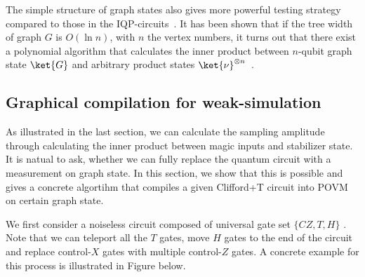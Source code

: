 \documentclass[aps,%
twocolumn,%
floatfix,%
pra,%
amsfonts,%
longbibliography,%
groupedaddress,%
superscriptaddress]{revtex4-2}%
\newcommand{\1}{\mathbbm{1}}
\begin{document}
The simple structure of graph states also gives more powerful testing strategy compared to those in the  IQP-circuits~\cite{nelson2024polynomial,rajakumar2024polynomialtimeclassicalsimulationnoisy}. It has been shown that if the tree width of graph $G$ is $O(\ln n)$, with $n$ the vertex numbers, it turns out that there exist a polynomial algorithm that calculates the inner product between $n$-qubit graph state $\ket{G}$ and arbitrary product states $\ket{\nu}^{\otimes n}$~\cite{van2007classical}.


\subsection{Graphical compilation for weak-simulation}
As illustrated in the last section, we can calculate the sampling amplitude through calculating the inner product between magic inputs and stabilizer state. It is natual to ask, whether we can fully replace the quantum circuit with a measurement on graph state. In this section, we show that this is possible and gives a concrete algortihm that compiles a given Clifford+T circuit into POVM on certain graph state.
 
We first consider a noiseless circuit composed of universal gate set $\{CZ, T,H\}$ . Note that we can teleport all the $T$ gates, move $H$ gates to the end of the circuit and replace control-$X$ gates with multiple control-$Z$ gates. A concrete example for this process is illustrated in Figure below.
\end{document}
